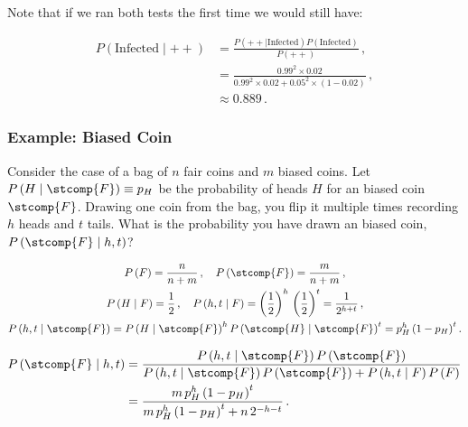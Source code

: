 \noindent Note that if we ran both tests the first time we would still have:

\begin{equation}\label{eq:stats:Bayes_rule:medical_test_3}
\begin{split}
P\left(\text{Infected} \mid ++\right) &= \frac{P\left(++ \mid \text{Infected}\right) P\left(\text{Infected}\right)}{P\left(++\right)}\,, \\
&= \frac{\num{0.99}^{2} \times \num{0.02}}{\num{0.99}^{2} \times \num{0.02} + \num{0.05}^{2} \times \left(1-\num{0.02}\right)}\,, \\
&\approx \num{0.889}\,.
\end{split}
\end{equation}

\subsubsection{Example: Biased Coin}
\label{stats:Bayes_rule:biased_coin}

Consider the case of a bag of $n$ fair coins and $m$ biased coins.
Let $P\left(H \mid \stcomp{F}\right) \equiv p_{H}$ be the \apriori probability of heads $H$ for an biased coin $\stcomp{F}$.
Drawing one coin from the bag, you flip it multiple times recording $h$ heads and $t$ tails.
What is the probability you have drawn an biased coin, $P\left(\stcomp{F} \mid h,t\right)$?

\begin{equation}\label{eq:stats:Bayes_rule:biased_coin_setup}
\begin{gathered}
P\left(F\right) = \frac{n}{n+m}\,,\quad P\left(\stcomp{F}\right) = \frac{m}{n+m}\,, \\
P\left(H \mid F\right) = \frac{1}{2}\,,\quad P\left(h,t \mid F\right) = \left(\frac{1}{2}\right)^{h}\,\left(\frac{1}{2}\right)^{t} = \frac{1}{2^{h+t}}\,, \\
P\left(h,t \mid \stcomp{F}\right) = P\left(H \mid \stcomp{F}\right)^{h} P\left(\stcomp{H} \mid \stcomp{F}\right)^{t} = p_{H}^{h} \left(1-p_{H}\right)^{t}.
\end{gathered}
\end{equation}

\begin{equation}\label{eq:stats:Bayes_rule:biased_coin_solution}
\begin{split}
P\left(\stcomp{F} \mid h,t\right) &= \frac{
P\left(h,t \mid \stcomp{F}\right) P\left(\stcomp{F}\right)}{
P\left(h,t \mid \stcomp{F}\right) P\left(\stcomp{F}\right) + P\left(h,t \mid F\right) P\left(F\right)} \\
&= \frac{
m\,p_{H}^{h} \left(1-p_{H}\right)^{t}}{
m\,p_{H}^{h} \left(1-p_{H}\right)^{t} + n\,2^{-h-t}}\,.
\end{split}
\end{equation}

